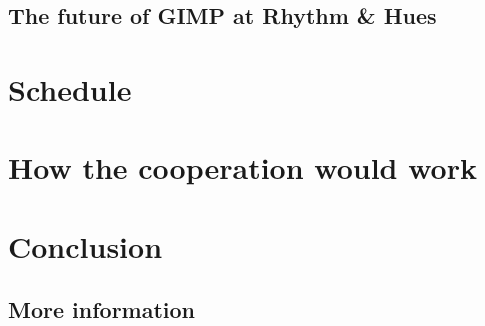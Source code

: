 \documentclass{report}
\begin{document}
\section{The future of GIMP at Rhythm \& Hues} 


\chapter{Schedule}


\chapter{How the cooperation would work}



\chapter{Conclusion}


\section{More information}

{
\small


}
\end{document}

